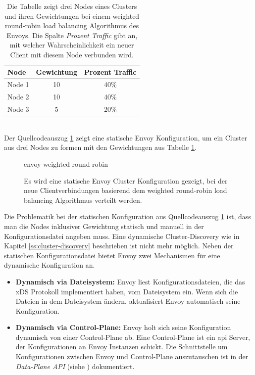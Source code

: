 \begin{table}[h!]
\centering
\renewcommand{\arraystretch}{1.5}
\begin{tabular}{|l|c|c|}
    \hline
    \textbf{Node} & \textbf{Gewichtung} & \textbf{Prozent Traffic} \\
    \hline
    \hline
    Node 1 & 10 & 40\% \\
    \hline
    Node 2 & 10 & 40\% \\
    \hline
    Node 3 & 5 & 20\% \\
    \hline
\end{tabular}
\caption{Die Tabelle zeigt drei Nodes eines Clusters und ihren Gewichtungen bei einem weighted round-robin load balancing Algorithmus des Envoys. Die Spalte \textit{Prozent Traffic} gibt an, mit welcher Wahrscheinlichkeit ein neuer Client mit diesem Node verbunden wird.}
\label{table:example-cluster-weight}
\end{table}
\\
Der Quellcodeauszug \ref{code:envoy-cluster-weight} zeigt eine statische Envoy Konfiguration, um ein Cluster aus drei Nodes zu formen mit den Gewichtungen aus Tabelle \ref{table:example-cluster-weight}.
\begin{figure}
    {envoy-weighted-round-robin}
    \caption{Es wird eine statische Envoy Cluster Konfiguration gezeigt, bei der neue Clientverbindungen basierend dem weighted round-robin load balancing Algorithmus verteilt werden.}
    \label{code:envoy-cluster-weight}
\end{figure}
\newpage\noindent
Die Problematik bei der statischen Konfiguration aus Quellcodeauszug \ref{code:envoy-cluster-weight} ist, dass man die Nodes inklusiver Gewichtung statisch und manuell in der Konfigurationsdatei angeben muss. Eine dynamische Cluster-Discovery wie in Kapitel \ref{ss:cluster-discovery} beschrieben ist nicht mehr möglich.
Neben der statischen Konfigurationsdatei bietet Envoy zwei Mechanismen für eine dynamische Konfiguration an.
\begin{itemize}
  \item \textbf{Dynamisch via Dateisystem:} Envoy liest Konfigurationsdateien, die das xDS Protokoll implementiert haben, vom Dateisystem ein. Wenn sich die Dateien in dem Dateisystem ändern, aktualisiert Envoy automatisch seine Konfiguration.
    \cite{ConfigurationDynamicFilesystem}
  \item \textbf{Dynamisch via Control-Plane:} Envoy holt sich seine Konfiguration dynamisch von einer Control-Plane ab. Eine Control-Plane ist ein \ac{api} Server, der Konfigurationen an Envoy Instanzen schickt. Die Schnittstelle um Konfigurationen zwischen Envoy und Control-Plane auszutauschen ist in der \textit{Data-Plane API} (siehe \cite{EnvoyproxyDataplaneapi2021}) dokumentiert.
    \cite{ConfigurationDynamicControl}
\end{itemize}
